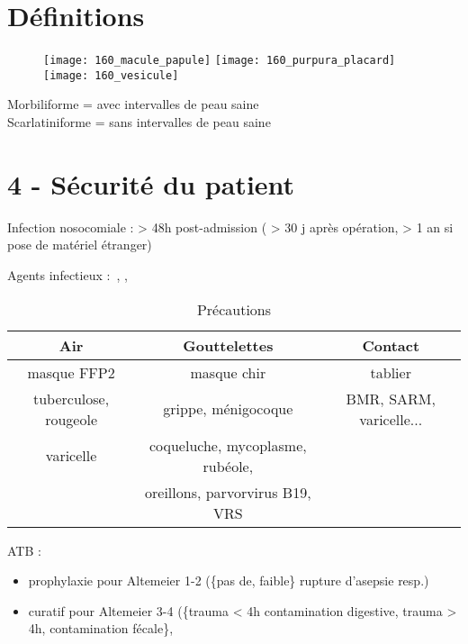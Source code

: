 \graphicspath{{../../pictures/medecine/}}

\usetikzlibrary{quotes}

\section{Définitions}%
\label{sec:definitions}

\begin{figure}
  \centering
  \texttt{[image: 160\_macule\_papule]}
  \texttt{[image: 160\_purpura\_placard]}
  \texttt{[image: 160\_vesicule]}
\end{figure}

Morbiliforme = avec intervalles de peau saine\\
Scarlatiniforme = sans intervalles de peau saine


\section{4 - Sécurité du patient}%
\label{sec:ue_1_item_4_securite_du_patient}

Infection nosocomiale : > 48h post-admission ( > 30 j après opération, > 1 an si
pose de matériel étranger)

Agents infectieux : , , 

\begin{table}[htpb]
  \centering
  \caption{Précautions}
  \begin{tabular}{ccc}
    \toprule
    Air & Gouttelettes & Contact  \\
    \midrule
    masque FFP2 & masque chir & tablier \\
    tuberculose, rougeole & grippe, ménigocoque & BMR, SARM, varicelle...\\
    varicelle & coqueluche, mycoplasme, rubéole, & \\
    & oreillons, parvorvirus B19, VRS & \\
    \bottomrule
  \end{tabular}
\end{table}

ATB :
\begin{itemize}
  \item prophylaxie pour Altemeier 1-2 (\{pas de, faible\} rupture d'asepsie
    resp.)
  \item curatif pour Altemeier 3-4 (\{trauma < 4h contamination digestive,
    trauma > 4h, contamination fécale\}, 
\end{itemize}

